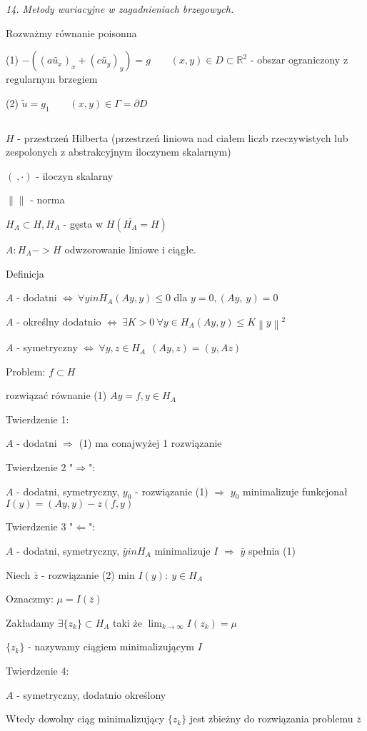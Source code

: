 \textit{14. Metody wariacyjne w zagadnieniach brzegowych.}

Rozważmy równanie poisonna

(1) $-((a\tilde{u_x})_x + (c\tilde{u_y})_y) = g\ \ \ \ \ \ \ \ \ (x,y) \in D \subset \mathbb{R}^2$ - obszar ograniczony z regularnym brzegiem

(2) $\tilde{u} = g_1\ \ \ \ \ \ \ \ \ (x,y) \in \Gamma = \partial D$

$\ $

$H$ - przestrzeń Hilberta (przestrzeń liniowa nad ciałem liczb rzeczywistych lub zespolonych z abstrakcyjnym iloczynem skalarnym)

$(\ ,\cdot)$ - iloczyn skalarny

$\left \|  \right \|$ - norma

$H_A \subset H, H_A$ - gęsta w $H (\bar{H_A} = H)$

$A: H_A -> H$ odwzorowanie liniowe i ciągłe.

Definicja

$A$ - dodatni $\Leftrightarrow\ \forall y in H_A (Ay,y) \leqslant 0$    dla $y = 0, (Ay,\ y) = 0$

$A$ - określny dodatnio $\Leftrightarrow\ \exists K > 0\ \forall y \in H_A (Ay,y) \leqslant K \left \| y \right \| ^ 2$

$A$ - symetryczny $\Leftrightarrow\ \forall y,z \in H_A\ \ (Ay,z) = (y,Az)$

Problem: $f \subset H$

    rozwiązać równanie (1) $Ay=f, y \in H_A$
    
Twierdzenie 1:

$A$ - dodatni $\Rightarrow$ (1) ma conajwyżej 1 rozwiązanie

Twierdzenie 2 "$\Rightarrow$":

$A$ - dodatni, symetryczny, $y_0$ - rozwiązanie (1) $\Rightarrow$ $y_0$ minimalizuje funkcjonał $I(y) = (Ay,y) - z(f,y)$

Twierdzenie 3 "$\Leftarrow$":

$A$ - dodatni, symetryczny, $\bar{y} in H_A$ minimalizuje $I$ $\Rightarrow$ $\bar{y}$ spełnia (1)


Niech $\bar{z}$ - rozwiązanie (2) min ${ I(y):\ y \in H_A}$

Oznaczmy: $\mu = I(\bar{z})$

Zakładamy $\exists \{z_k\} \subset H_A$ taki że $\lim_{k \to \infty} I(z_k) = \mu$

$\{z_k\}$ - nazywamy ciągiem minimalizującym $I$

Twierdzenie 4:

$A$ - symetryczny, dodatnio określony

Wtedy dowolny ciąg minimalizujący $\{z_k\}$ jest zbieżny do rozwiązania problemu $\bar{z}$
